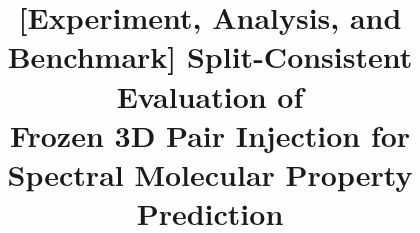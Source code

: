 \documentclass[conference]{IEEEtran}
\begin{document}
\title{[Experiment, Analysis, and Benchmark] Split-Consistent Evaluation of\\
Frozen 3D Pair Injection for Spectral Molecular Property Prediction}

\author{
}

\maketitle
\end{document}
